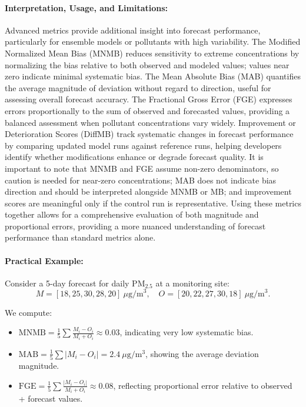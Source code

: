 \paragraph{Interpretation, Usage, and Limitations:}
Advanced metrics provide additional insight into forecast performance, particularly for ensemble models or pollutants with high variability. The Modified Normalized Mean Bias (MNMB) reduces sensitivity to extreme concentrations by normalizing the bias relative to both observed and modeled values; values near zero indicate minimal systematic bias. The Mean Absolute Bias (MAB) quantifies the average magnitude of deviation without regard to direction, useful for assessing overall forecast accuracy. The Fractional Gross Error (FGE) expresses errors proportionally to the sum of observed and forecasted values, providing a balanced assessment when pollutant concentrations vary widely. Improvement or Deterioration Scores (DiffMB) track systematic changes in forecast performance by comparing updated model runs against reference runs, helping developers identify whether modifications enhance or degrade forecast quality. It is important to note that MNMB and FGE assume non-zero denominators, so caution is needed for near-zero concentrations; MAB does not indicate bias direction and should be interpreted alongside MNMB or MB; and improvement scores are meaningful only if the control run is representative. Using these metrics together allows for a comprehensive evaluation of both magnitude and proportional errors, providing a more nuanced understanding of forecast performance than standard metrics alone.

\paragraph{Practical Example:}
Consider a 5-day forecast for daily PM$_{2.5}$ at a monitoring site:
\[
M = [18, 25, 30, 28, 20]\ \mu\mathrm{g/m^3}, \quad
O = [20, 22, 27, 30, 18]\ \mu\mathrm{g/m^3}.
\]

We compute:
\begin{itemize}
	\item $\mathrm{MNMB} = \frac{1}{5} \sum \frac{M_i - O_i}{M_i + O_i} \approx 0.03$, indicating very low systematic bias.
	\item $\mathrm{MAB} = \frac{1}{5} \sum |M_i - O_i| = 2.4\ \mu\mathrm{g/m^3}$, showing the average deviation magnitude.
	\item $\mathrm{FGE} = \frac{1}{5} \sum \frac{|M_i - O_i|}{M_i + O_i} \approx 0.08$, reflecting proportional error relative to observed + forecast values.
\end{itemize}

